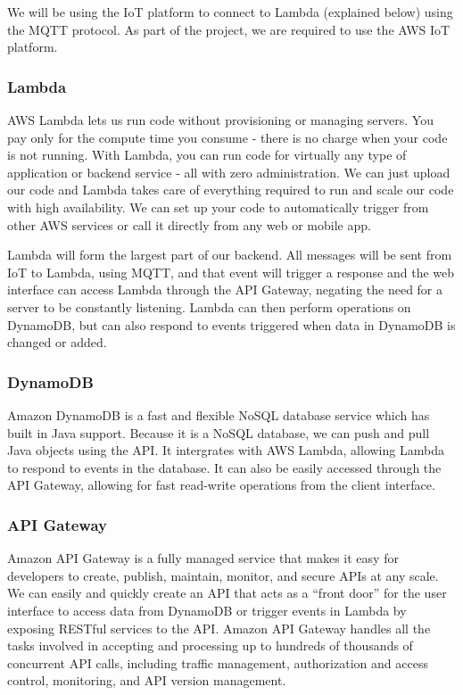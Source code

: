 \documentclass{article}
\begin{document}
		We will be using the IoT platform to connect to Lambda (explained below) using the MQTT protocol. As part of the project, we are required to use the AWS IoT platform.
	\subsubsection{Lambda}
		AWS Lambda lets us run code without provisioning or managing servers. You pay only for the compute time you consume - there is no charge when your code is not running. With Lambda, you can run code for virtually any type of application or backend service - all with zero administration. We can just upload our code and Lambda takes care of everything required to run and scale our code with high availability. We can set up your code to automatically trigger from other AWS services or call it directly from any web or mobile app.
		
		Lambda will form the largest part of our backend. All messages will be sent from IoT to Lambda, using MQTT, and that event will trigger a response and the web interface can access Lambda through the API Gateway, negating the need for a server to be constantly listening. Lambda can then perform operations on DynamoDB, but can also respond to events triggered when data in DynamoDB is changed or added. 
	\subsubsection{DynamoDB}
		Amazon DynamoDB is a fast and flexible NoSQL database service which has built in Java support. Because it is a NoSQL database, we can push and pull Java objects using the API. It intergrates with AWS Lambda, allowing Lambda to respond to events in the database. It can also be easily accessed through the API Gateway, allowing for fast read-write operations from the client interface.
	\subsubsection{API Gateway}
		Amazon API Gateway is a fully managed service that makes it easy for developers to create, publish, maintain, monitor, and secure APIs at any scale. We can easily and quickly create an API that acts as a “front door” for the user interface to access data from DynamoDB or trigger events in Lambda by exposing RESTful services to the API. Amazon API Gateway handles all the tasks involved in accepting and processing up to hundreds of thousands of concurrent API calls, including traffic management, authorization and access control, monitoring, and API version management.
\end{document}
